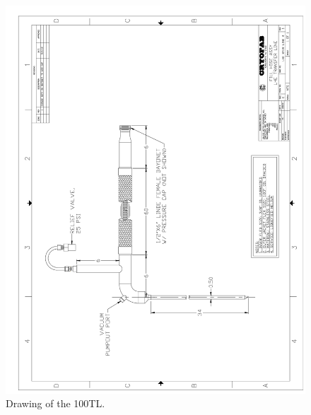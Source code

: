 \begin{appendices}
\begin{figure}[tbp!]
 \centering
 \includegraphics[width=\textwidth]{./img/100TL-drawing.png}
 \caption{Drawing of the 100TL.}
 \label{fig:100TL-drawing}
\end{figure}
\end{appendices}
